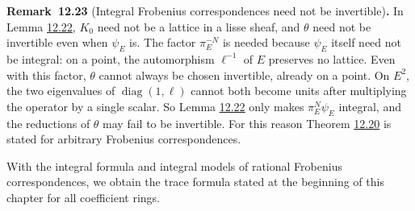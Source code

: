 \documentclass[11pt]{article}
\newenvironment{bpstatement}[2]{\par\addvspace{0.6\baselineskip}\noindent\textbf{#1}#2\textbf{.}\enspace\ignorespaces}
  {\par\addvspace{0.4\baselineskip}}
\begin{document}
\label{bp71}%
\begin{bpstatement}{Remark~12.23}{ (Integral Frobenius correspondences need not be invertible)}
In Lemma \hyperref[bp69]{12.22}, \(K_0\) need not be a lattice in a lisse sheaf, and \(\theta\) need not be invertible even when \(\psi_E\) is. The factor \(\pi_E^{-N}\) is needed because \(\psi_E\) itself need not be integral: on a point, the automorphism \(\ell^{-1}\) of \(E\) preserves no lattice. Even with this factor, \(\theta\) cannot always be chosen invertible, already on a point. On \(E^2\), the two eigenvalues of \(\operatorname{diag}(1,\ell)\) cannot both become units after multiplying the operator by a single scalar. So Lemma \hyperref[bp69]{12.22} only makes \(\pi_E^N\psi_E\) integral, and the reductions of \(\theta\) may fail to be invertible. For this reason Theorem \hyperref[bp62]{12.20} is stated for arbitrary Frobenius correspondences.
\end{bpstatement}

\label{bp72}%
With the integral formula and integral models of rational Frobenius correspondences, we obtain the trace formula stated at the beginning of this chapter for all coefficient rings.
\end{document}
